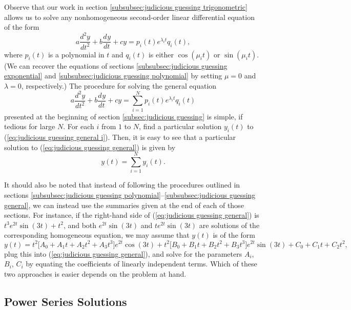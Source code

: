 \documentclass{myart}
\newcommand{\eq}[1]{(\ref{eq:#1})}
\newcommand{\deriv}[3][]{\frac{d^{#1}#2}{d#3^{#1}}}
\begin{document}
Observe that our work in section \ref{subsubsec:judicious guessing trigonometric} allows us to solve any nonhomogeneous second-order linear differential equation of the form
\begin{equation} \label{eq:judicious guessing general i}
a \deriv[2]{y}{t} + b \deriv{y}{t} + cy = p_i(t)e^{\lambda_i t}q_i(t),
\end{equation}
where $p_i(t)$ is a polynomial in $t$ and $q_i(t)$ is either $\cos(\mu_i t)$ or $\sin(\mu_i t)$. (We can recover the equations of sections \ref{subsubsec:judicious guessing exponential} and \ref{subsubsec:judicious guessing polynomial} by setting $\mu = 0$ and $\lambda = 0$, respectively.) The procedure for solving the general equation
\begin{equation} \label{eq:judicious guessing general}
a \deriv[2]{y}{t} + b \deriv{y}{t} + cy = \sum_{i=1}^N p_i(t)e^{\lambda_i t}q_i(t)
\end{equation}
presented at the beginning of section \ref{subsec:judicious guessing} is simple, if tedious for large $N$. For each $i$ from $1$ to $N$, find a particular solution $y_i(t)$ to \eq{judicious guessing general i}. Then, it is easy to see that a particular solution to \eq{judicious guessing general} is given by
\begin{equation*}
y(t) = \sum_{i=1}^N y_i(t).
\end{equation*}

It should also be noted that instead of following the procedures outlined in sections \ref{subsubsec:judicious guessing polynomial}--\ref{subsubsec:judicious guessing general}, we can instead use the summaries given at the end of each of those sections. For instance, if the right-hand side of \eq{judicious guessing general} is $t^3 e^{2t} \sin(3t) + t^2$, and both $e^{2t} \sin(3t)$ and $te^{2t} \sin(3t)$ are solutions of the corresponding homogeneous equation, we may assume that $y(t)$ is of the form
\begin{equation*}
y(t) = t^2\Big[A_0 + A_1t + A_2t^2 + A_3t^3\Big] e^{2t} \cos(3t) + t^2\Big[B_0 + B_1t + B_2t^2 + B_3t^3\Big] e^{2t} \sin(3t) + C_0 + C_1t + C_2t^2,
\end{equation*}
plug this into \eq{judicious guessing general}, and solve for the parameters $A_i$, $B_i$, $C_i$ by equating the coefficients of linearly independent terms. Which of these two approaches is easier depends on the problem at hand.

\subsection{Power Series Solutions} \label{subsec:power series}
\end{document}
